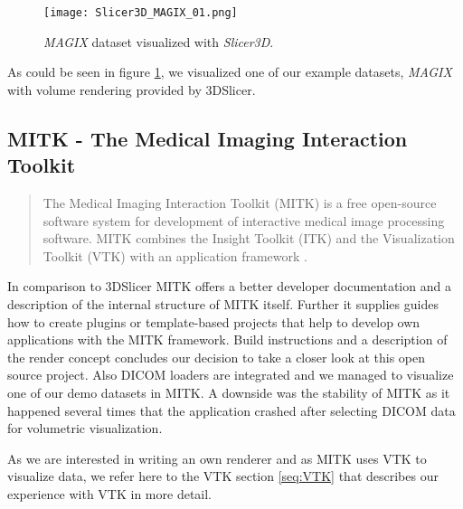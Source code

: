 
\begin{figure}[h]
	\centering
	\texttt{[image: Slicer3D\_MAGIX\_01.png]} \\
	\caption{ \emph{MAGIX}\cite{gimias_sampledata_2018} dataset visualized with \emph{Slicer3D}.}
	\label{fig:Slicer3D_MAGIX_01}
\end{figure}

As could be seen in figure \ref{fig:Slicer3D_MAGIX_01}, we visualized one of our example datasets, \emph{MAGIX} with volume rendering provided by 3DSlicer.


\subsection{MITK - The Medical Imaging Interaction Toolkit}

\blockquote{The Medical Imaging Interaction Toolkit (MITK) is a free open-source software system for development of interactive medical image processing software. MITK combines the Insight Toolkit (ITK) and the Visualization Toolkit (VTK) with an application framework \cite{MITK_2018}.}

In comparison to 3DSlicer MITK offers a better developer documentation and a description of the internal structure of MITK itself. Further it supplies guides how to create plugins or template-based projects that help to develop own applications with the MITK framework. Build instructions and a description of the render concept concludes our decision to take a closer look at this open source project.
Also DICOM loaders are integrated and we managed to visualize one of our demo datasets in MITK. A downside was the stability of MITK as it happened several times that the application crashed after selecting DICOM data for volumetric visualization.

As we are interested in writing an own renderer and as MITK uses VTK to visualize data, we refer here to the VTK section \ref{seq:VTK} that describes our experience with VTK in more detail.


